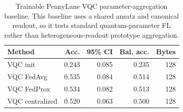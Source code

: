 ﻿\begin{table}[t]
\centering
\caption{Trainable PennyLane VQC parameter-aggregation baseline. This baseline uses a shared ansatz and canonical readout, so it tests standard quantum-parameter FL rather than heterogeneous-readout prototype aggregation.}
\label{tab:quantum-param-vqc}
\begin{tabular}{lrrrr}
\toprule
Method & Acc. & 95\% CI & Bal. acc. & Bytes \\
\midrule
VQC init & 0.243 & 0.085 & 0.235 & 128 \\
VQC FedAvg & 0.535 & 0.084 & 0.514 & 128 \\
VQC FedProx & 0.534 & 0.082 & 0.513 & 128 \\
VQC centralized & 0.520 & 0.063 & 0.500 & 128 \\
\bottomrule
\end{tabular}
\end{table}

